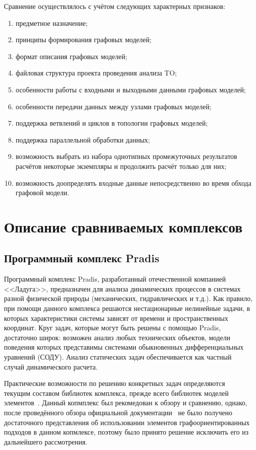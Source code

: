 Сравнение осуществлялось с учётом следующих характерных признаков:
\begin{enumerate}
    \item предметное назначение;
    \item принципы формирования графовых моделей;
    \item формат описания графовых моделей;
    \item файловая структура проекта проведения анализа \gls{TO};
    \item особенности работы с входными и выходными данными графовых моделей;
    \item особенности передачи данных между узлами графовых моделей;
    \item поддержка ветвлений и циклов в топологии графовых моделей;
    \item поддержка параллельной обработки данных;
    \item возможность выбрать из набора однотипных промежуточных результатов расчётов некоторые экземпляры и продолжить расчёт только для них;
    \item возможность доопределять входные данные непосредственно во время обхода графовой модели.
\end{enumerate}

\section{Описание сравниваемых комплексов}
\subsection{Программный комплекс Pradis}

Программный комплекс \textsf{Pradis}, разработанный отечественной компанией <<Ладуга>>, предназначен для анализа динамических процессов в системах разной физической природы (механических, гидравлических и т.д.). Как правило, при помощи данного комплекса решаются нестационарные нелинейные задачи, в которых характеристики системы зависят от времени и пространственных координат. Круг задач, которые могут быть решены с помощью \textsf{Pradis}, достаточно широк: возможен анализ любых технических объектов, модели поведения которых представимы системами обыкновенных дифференциальных уравнений (СОДУ). Анализ статических задач обеспечивается как частный случай динамического расчета.

Практические возможности по решению конкретных задач определяются текущим составом библиотек комплекса, прежде всего библиотек моделей элементов~\cite{PradisGeneral2007}. Данный копмплекс был рекомедован к обзору и сравнению, однако, после проведённого обзора официальной документации~\cite{PradisMethods2007} не было получено достаточного представления об использовании элементов графоориентированных подходов в данном копмлексе, поэтому было принято решение исключить его из дальнейшего рассмотрения.

